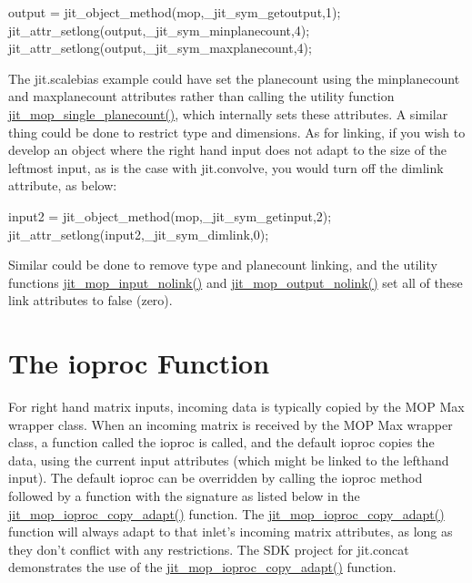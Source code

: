 \begin{DoxyCode}
   output = jit_object_method(mop,_jit_sym_getoutput,1);
   jit_attr_setlong(output,_jit_sym_minplanecount,4);
   jit_attr_setlong(output,_jit_sym_maxplanecount,4);
\end{DoxyCode}


The jit.scalebias example could have set the planecount using the minplanecount and maxplanecount attributes rather than calling the utility function \hyperlink{group__mopmod_gada02eaa2a5dc001cdb120a83cb093e25}{jit\_\-mop\_\-single\_\-planecount()}, which internally sets these attributes. A similar thing could be done to restrict type and dimensions. As for linking, if you wish to develop an object where the right hand input does not adapt to the size of the leftmost input, as is the case with jit.convolve, you would turn off the dimlink attribute, as below:


\begin{DoxyCode}
   input2 = jit_object_method(mop,_jit_sym_getinput,2);
   jit_attr_setlong(input2,_jit_sym_dimlink,0);
\end{DoxyCode}


Similar could be done to remove type and planecount linking, and the utility functions \hyperlink{group__mopmod_ga3f223fa6414f856e2484dbab7508945f}{jit\_\-mop\_\-input\_\-nolink()} and \hyperlink{group__mopmod_ga6878129233c6c88c43b8512db44a43ff}{jit\_\-mop\_\-output\_\-nolink()} set all of these link attributes to false (zero).\hypertarget{chapter_jit_mopdetails_chapter_jit_mopdetails_ioproc}{}\section{The ioproc Function}\label{chapter_jit_mopdetails_chapter_jit_mopdetails_ioproc}
For right hand matrix inputs, incoming data is typically copied by the MOP Max wrapper class. When an incoming matrix is received by the MOP Max wrapper class, a function called the ioproc is called, and the default ioproc copies the data, using the current input attributes (which might be linked to the lefthand input). The default ioproc can be overridden by calling the ioproc method followed by a function with the signature as listed below in the \hyperlink{group__mopmod_ga9d6c3b36f1e4a7ef30d674eda4196a5c}{jit\_\-mop\_\-ioproc\_\-copy\_\-adapt()} function. The \hyperlink{group__mopmod_ga9d6c3b36f1e4a7ef30d674eda4196a5c}{jit\_\-mop\_\-ioproc\_\-copy\_\-adapt()} function will always adapt to that inlet's incoming matrix attributes, as long as they don't conflict with any restrictions. The SDK project for jit.concat demonstrates the use of the \hyperlink{group__mopmod_ga9d6c3b36f1e4a7ef30d674eda4196a5c}{jit\_\-mop\_\-ioproc\_\-copy\_\-adapt()} function.


